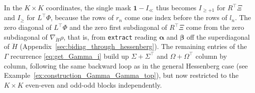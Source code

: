\documentclass[a4paper,12pt]{article}
\theoremstyle{definition}
\begin{document}
In the $K \times K$ coordinates, the single mask $\mathbf{1} - I_{\ll}$ thus becomes $I_{\geq+1}$ for $R^\top \Xi$ and $I_{\geq}$ for $L^\top \Phi$, because the rows of $r_n$ come one index before the rows of $l_n$. The zero diagonal of $L^\top \Phi$ and the zero first subdiagonal of $R^\top \Xi$ come from the zero subdiagonal of $\nabla_{\dddot{H}} \rho$, that is, from \texttt{extract} reading $\boldsymbol{\alpha}$ and $\boldsymbol{\beta}$ off the superdiagonal of $\dddot{H}$ (Appendix~\ref{sec:bidiag_through_hessenberg}).
The remaining entries of the $\Gamma$ recurrence \eqref{eq:get_Gamma_i} build up $\Sigma + \Sigma^\top$ and $\Omega + \Omega^\top$ column by column, following the same backward loop as in the general Hessenberg case (see Example~\ref{ex:construction_Gamma_Gamma_top}), but now restricted to the $K \times K$ even-even and odd-odd blocks independently.
\end{document}
